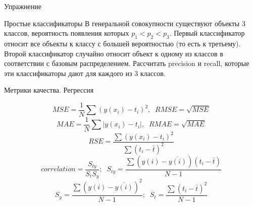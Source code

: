 \documentclass[10pt,a4paper]{beamer}
\begin{document}

\begin{frame}{Упражнение}

\begin{exampleblock}{Простые классификаторы}
В генеральной совокупности существуют объекты 3 классов, вероятность появления которых $p_1 < p_2 < p_3$. Первый классификатор относит все объекты к классу с большей вероятностью (то есть к третьему). Второй классификатор случайно относит объект к одному из классов в соответствии с базовым распределением. Рассчитать precision и recall, которые эти классификаторы дают для каждого из 3 классов.
\end{exampleblock}

\end{frame}


\begin{frame}{Метрики качества. Регрессия}

\[
MSE = \frac 1 N \sum (y(x_i) - t_i)^2, \;\; RMSE = \sqrt{MSE}
\]
\[
MAE =  \frac 1 N \sum |y(x_i) - t_i|, \;\; RMAE = \sqrt{MAE}
\]
\[
RSE =  \frac{\sum (y(x_i) - t_i)^2}{\sum (t_i - \bar{t})^2}
\]
\[
correlation = \frac{S_{ty}}{S_t S_y};\;\; S_{ty} = \frac{\sum(y(i)-\overline{y(i)})(t_i - \bar t)}{N-1}
\]
\[
S_{y} = \frac{\sum(y(i)-\overline{y(i)})^2}{N-1};\;\;S_{t} = \frac{\sum(t_i - \bar t)^2}{N-1}
\]

\end{frame}

\end{document}
